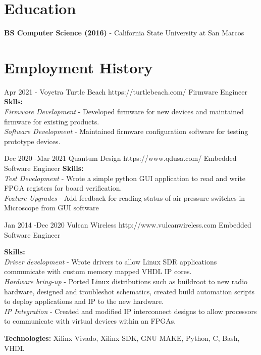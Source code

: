 \documentclass[10pt]{article} %
\begin{document}
\section{Education}

\textbf{BS Computer Science (2016)} - California State University at San Marcos




\section{Employment History}

\job
{Apr 2021 -}{}
{Voyetra Turtle Beach}
{https://turtlebeach.com/}
{Firmware Engineer}
{\textbf{Sklls:}\\
\textit{Firmware Development} - Developed firmware for new devices and maintained firmware for existing products. \\
\textit{Software Development} - Maintained firmware configuration software for testing prototype devices. \\
}

\job
{Dec 2020 -}{Mar 2021}
{Quantum Design}
{https://www.qdusa.com/}
{Embedded Software Engineer}
{\textbf{Skills:}\\
\textit{Test Development} - Wrote a simple python GUI application to read and write FPGA registers for board verification. \\
\textit{Feature Upgrades} - Add feedback for reading status of air pressure switches in Microscope from GUI software \\
}

\job
{Jan 2014 -}{Dec 2020}
{Vulcan Wireless}
{http://www.vulcanwireless.com}
{Embedded Software Engineer}
{\textbf{Skills:}\\
\textit{Driver development} - Wrote drivers to allow Linux SDR applications communicate with custom memory mapped VHDL IP cores. \\
\textit{Hardware bring-up} - Ported Linux distributions such as buildroot to new radio hardware, designed and troubleshot schematics, created build automation scripts to deploy applications and IP to the new hardware.\\
\textit{IP Integration} - Created and modified IP interconnect designs to allow processors to communicate with virtual devices within an FPGAs.\\
\rule{0mm}{5mm}\textbf{Technologies:} Xilinx Vivado, Xilinx SDK, GNU MAKE, Python, C, Bash, VHDL}
\end{document}
